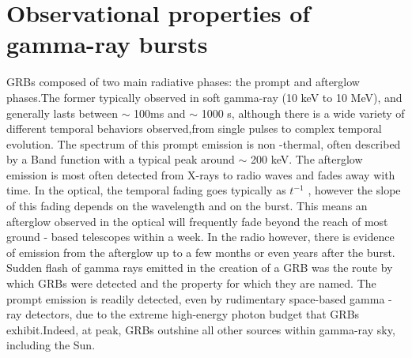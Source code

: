 \section{Observational properties of gamma-ray bursts }
GRBs composed of two main radiative phases: the prompt and afterglow phases.The former typically observed in soft gamma-ray (10 keV to 10 MeV), and generally  lasts between $ \sim $ 100ms and $ \sim $ 1000 s, although there is a wide variety of different temporal behaviors observed,from single pulses to complex temporal evolution. The spectrum of this prompt emission is non -thermal, often described by a Band function with a typical peak around $ \sim $ 200 keV.
The afterglow emission is most often detected from X-rays to radio waves and fades  away  with time. In the optical, the temporal fading goes typically as $ t^{-1} $ , however the slope of this fading depends on the wavelength and on the burst. This means an afterglow observed in the optical will frequently fade beyond  the  reach  of  most  ground - based  telescopes  within a week. In the  radio however, there is evidence of  emission from the afterglow up to a few months or even years after the burst. Sudden flash of gamma rays emitted in the creation of a GRB was the route by which GRBs were detected and the property for which they are named. The  prompt emission is readily detected, even by rudimentary space-based  gamma - ray detectors, due to the extreme high-energy photon budget that GRBs exhibit.Indeed, at peak, GRBs outshine all other sources within gamma-ray sky, including the Sun.\citep{18}\\
